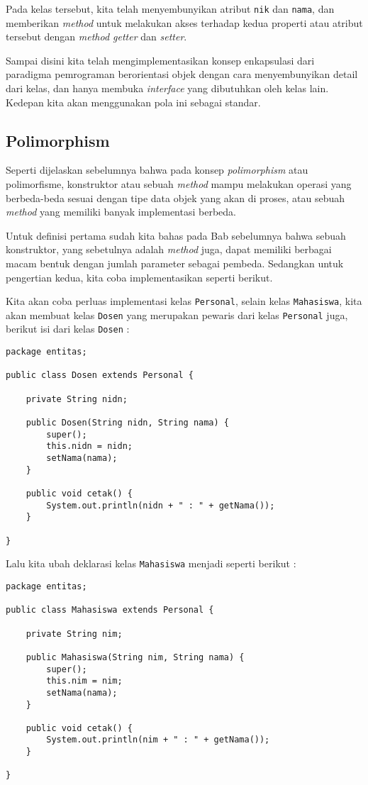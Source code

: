Pada kelas tersebut, kita telah menyembunyikan atribut \texttt{nik} dan \texttt{nama}, dan memberikan \textit{method} untuk melakukan akses terhadap kedua properti atau atribut tersebut dengan \textit{method getter} dan \textit{setter}.

Sampai disini kita telah mengimplementasikan konsep enkapsulasi dari paradigma pemrograman berorientasi objek dengan cara menyembunyikan detail dari kelas, dan hanya membuka \textit{interface} yang dibutuhkan oleh kelas lain. Kedepan kita akan menggunakan pola ini sebagai standar.

\subsection{Polimorphism}

Seperti dijelaskan sebelumnya bahwa pada konsep \textit{polimorphism} atau polimorfisme, konstruktor atau sebuah \textit{method} mampu melakukan operasi yang berbeda-beda sesuai dengan tipe data objek yang akan di proses, atau sebuah \textit{method} yang memiliki banyak implementasi berbeda.

Untuk definisi pertama sudah kita bahas pada Bab sebelumnya bahwa sebuah konstruktor, yang sebetulnya adalah \textit{method} juga, dapat memiliki berbagai macam bentuk dengan jumlah parameter sebagai pembeda. Sedangkan untuk pengertian kedua, kita coba implementasikan seperti berikut.

Kita akan coba perluas implementasi kelas \texttt{Personal}, selain kelas \texttt{Mahasiswa}, kita akan membuat kelas \texttt{Dosen} yang merupakan pewaris dari kelas \texttt{Personal} juga, berikut isi dari kelas \texttt{Dosen} :

\begin{lstlisting}
package entitas;

public class Dosen extends Personal {

    private String nidn;

    public Dosen(String nidn, String nama) {
        super();
        this.nidn = nidn;
        setNama(nama);
    }

    public void cetak() {
        System.out.println(nidn + " : " + getNama());
    }

}
\end{lstlisting}

Lalu kita ubah deklarasi kelas \texttt{Mahasiswa} menjadi seperti berikut :

\begin{lstlisting}
package entitas;

public class Mahasiswa extends Personal {

    private String nim;

    public Mahasiswa(String nim, String nama) {
        super();
        this.nim = nim;
        setNama(nama);
    }

    public void cetak() {
        System.out.println(nim + " : " + getNama());
    }

}
\end{lstlisting}

